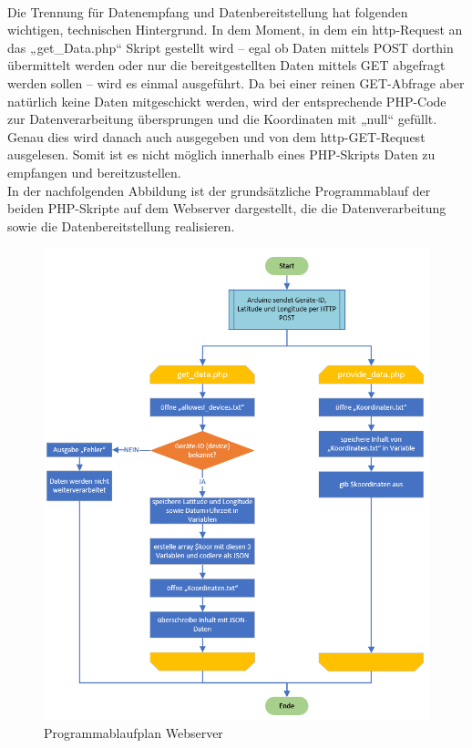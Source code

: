 \\
Die Trennung für Datenempfang und Datenbereitstellung hat folgenden wichtigen, technischen Hintergrund. In dem Moment, in dem ein http-Request an das „get\_Data.php“ Skript gestellt wird – egal ob Daten mittels POST dorthin übermittelt werden oder nur die bereitgestellten Daten mittels GET abgefragt werden sollen – wird es einmal ausgeführt. Da bei einer reinen GET-Abfrage aber natürlich keine Daten mitgeschickt werden, wird der entsprechende PHP-Code zur Datenverarbeitung übersprungen und die Koordinaten mit „null“ gefüllt. Genau dies wird danach auch ausgegeben und von dem http-GET-Request ausgelesen. Somit ist es nicht möglich innerhalb eines PHP-Skripts Daten zu empfangen und bereitzustellen.
\\
In der nachfolgenden Abbildung ist der grundsätzliche Programmablauf der beiden PHP-Skripte auf dem Webserver dargestellt, die die Datenverarbeitung sowie die Datenbereitstellung realisieren.
\begin{figure} [H]
	\begin{center}
		\includegraphics[width=1\textwidth]{Bilder/Webserver_PAP.png}
		\caption{Programmablaufplan Webserver}
		\label{server-pap}
	\end{center}
\end{figure}
